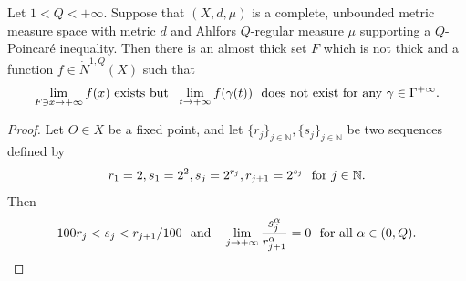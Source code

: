 \documentclass[10pt,a4paper]{amsart}
\begin{document}
 \begin{example}
 \label{example5.4-0709} Let $1<Q<+\infty$. Suppose that $(X,d,\mu)$ is a complete, unbounded metric measure space with metric $d$ and Ahlfors $Q$-regular measure $\mu$ supporting a $Q$-Poincar\'e inequality.  Then  there is an almost thick set $F$ which is not thick and a function $f\in \dot N^{1,Q}(X)$ such that
 \begin{equation}\label{eq6.3-0809}
 	\text{\rm  $\lim_{F\ni x\to+\infty}f(x)$ exists but\ \ }\lim_{t\to+\infty} f(\gamma(t)) \text{\rm \ \ does not exist for any $\gamma\in\Gamma^{+\infty}$.}
 \end{equation}
 \end{example}

 \begin{proof}Let $O\in X$ be a fixed point, and let 
% 
% 
$\{r_j\}_{j\in\mathbb N}, \{s_j\}_{j\in\mathbb N}$ be two sequences defined by 
 \[
 	r_1=2, s_1=2^{2}, s_{j}=2^{r_{j}}, r_{j+1}=2^{s_j} \ \ \text{\rm for  $j\in\mathbb N$}.
 \]
 Then 
 \begin{equation}\label{eq6.4-0809}
 	100 r_j<s_{j}<r_{j+1}/100 \ \ \text{\rm and \ \ } \lim_{j\to+\infty} \frac{s_j^\alpha}{r_{j+1}^\alpha}=0 \text{\rm \ \ for all $\alpha\in(0,Q)$}.
 \end{equation}


\end{proof}
\end{document}
